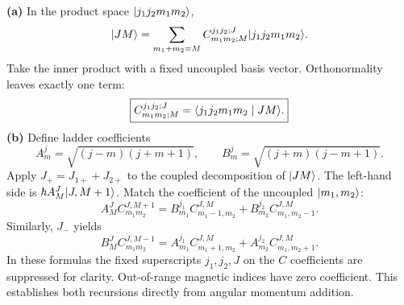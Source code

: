 \textbf{(a)} In the product space
$\lvert j_1j_2m_1m_2\rangle$,
\[
\lvert JM\rangle=\sum_{m_1+m_2=M}
C_{m_1m_2;M}^{j_1j_2;J}
\lvert j_1j_2m_1m_2\rangle.
\]
Take the inner product with a fixed
uncoupled basis vector.
Orthonormality leaves exactly one term:
\begin{equation}
\boxed{C_{m_1m_2;M}^{j_1j_2;J}
=\langle j_1j_2m_1m_2\mid JM\rangle.}
\end{equation}
\textbf{(b)} Define ladder coefficients
\[
A_m^j=\sqrt{(j-m)(j+m+1)},\qquad
B_m^j=\sqrt{(j+m)(j-m+1)}.
\]
Apply $J_+=J_{1+}+J_{2+}$ to the
coupled decomposition of $\lvert JM\rangle$.
The left-hand side is
$\hbar A_M^J\lvert J,M+1\rangle$.
Match the coefficient of the
uncoupled $\lvert m_1,m_2\rangle$:
\begin{equation}
\boxed{
A_M^J C^{J,M+1}_{m_1m_2}=
B_{m_1}^{j_1}C^{J,M}_{m_1-1,m_2}
+B_{m_2}^{j_2}C^{J,M}_{m_1,m_2-1}.}
\end{equation}
Similarly, $J_-$ yields
\begin{equation}
\boxed{
B_M^J C^{J,M-1}_{m_1m_2}=
A_{m_1}^{j_1}C^{J,M}_{m_1+1,m_2}
+A_{m_2}^{j_2}C^{J,M}_{m_1,m_2+1}.}
\end{equation}
In these formulas the fixed superscripts
$j_1,j_2,J$ on the $C$ coefficients
are suppressed for clarity.
Out-of-range magnetic indices have
zero coefficient. This establishes
both recursions directly from angular
momentum addition.

